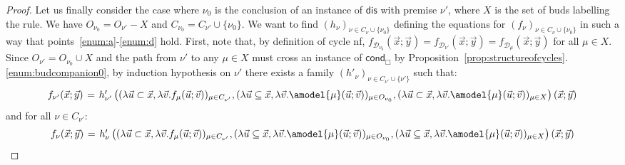 \documentclass[manuscript,screen]{acmart}
\renewcommand{\setminus}{-}
\newcommand{\red}[1]{{\color{red}#1}}
\theoremstyle{definition}
\theoremstyle{remark}
\newcommand{\sq}{\Box}
\newcommand{\cnd}{\mathsf{cond}}
\newcommand{\model}[1]{\denot{#1}}
\newcommand{\denot}[1]{f_{#1}}
\newcommand{\der}{\mathcal{D}}
\newcommand{\pder}[1]{\der_{#1}}
\newcommand{\close}[1]{{C}_{#1}}
\newcommand{\open}[1]{{O}_{#1}}
\newcommand{\hnu}{\nu_0}
\newcommand{\com}{\mathsf{dis}}
\begin{document}
\begin{proof}
  
Let us finally consider the case where $\hnu$ is the conclusion of an instance of  $\com$  with premise $\nu'$, where  $X$ is the set of buds labelling the rule. We have  $\open{\hnu}= \open{\nu'} \setminus X$ and $\close{\hnu}=\close{\nu'}\cup\{\hnu \}$. We want to find $(h_\nu)_{\nu \in \close \nu \cup \{ \hnu\}}$ defining the equations for $(\model{ \nu})_{\nu \in \close \nu \cup \{ \hnu\}}$   in such a way that points~\ref{enum:a}-\ref{enum:d} hold.  First, note that, by definition of cycle nf, $\model{\pder{\hnu}}(\vec{x}; \vec{y}) =\model{\pder{\nu'}}(\vec{x}; \vec{y})=\model{\pder \mu}(\vec{x}; \vec{y})$ for all $\mu \in X$. Since $ \open{\nu'}=\open \hnu \cup X$ and  the path from $\nu'$ to any  $\mu\in X$ must cross an instance of $\cnd_{\sq}$ by  Proposition~\ref{prop:structureofcycles}.\ref{enum:budcompanion0}, by  induction hypothesis on $\nu'$ there exists a family  $(h'_{\nu})_{\nu \in \close{\nu'}\cup \{ \nu'\}}$ such that:
\begin{equation}\label{eqn:1}
\arraycolsep=2pt
\begin{array}{rcll}
     \model{{\nu'}}(\vec{x}; \vec{y})
     &=& 
      h'_{\nu'}\left(( \lambda \vec{u}\subset \vec{x}, \lambda \vec v. \model{{\mu}}(\vec{u};\vec{v}))_{\mu \in \close{\nu'}},( \lambda \vec{u}\subseteq \vec{x}, \lambda \vec v. \amodel{{\mu}}(\vec{u};\vec{v}))_{\mu \in  \open{\hnu}},( \lambda \vec{u}\subset \vec{x}, \lambda \vec v. \amodel{{\mu}}(\vec{u};\vec{v}))_{\mu \in  X}\right)(\vec{x}; \vec{y})
\end{array}
\end{equation}
and for all $  \nu \in \close{\nu'}$:
\begin{equation}\label{eqn:2}
\arraycolsep=2pt
\begin{array}{rcll}
    \model{{\nu}}(\vec{x}; \vec{y})
     &=& 
      h'_{\nu}\left(( \lambda \vec{u}\subset \vec{x}, \lambda \vec v. \model{{\mu}}(\vec{u};\vec{v}))_{\mu \in \close{\nu'}},( \lambda \vec{u}\subseteq \vec{x}, \lambda \vec v. \amodel{{\mu}}(\vec{u};\vec{v}))_{\mu \in  \open{\hnu}},( \lambda \vec{u}\subseteq \vec{x}, \lambda \vec v. \amodel{{\mu}}(\vec{u};\vec{v}))_{\mu \in  X}\right)(\vec{x}; \vec{y})
   \end{array}
\end{equation}

\end{proof}
\end{document}

